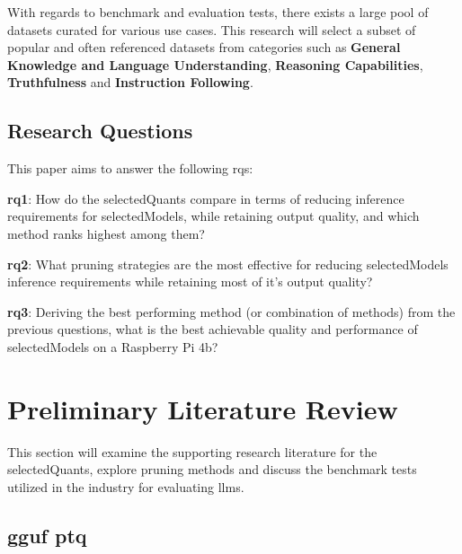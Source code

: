 \documentclass{ifacconf}
\begin{document}
	With regards to benchmark and evaluation tests, there exists a large pool of datasets curated for various use cases. This research will select a subset of popular and often referenced datasets from categories such as \textbf{General Knowledge and Language Understanding}, \textbf{Reasoning Capabilities}, \textbf{Truthfulness} and \textbf{Instruction Following}.
	
	\subsection{Research Questions}
	This paper aims to answer the following \glspl{rq}:
	
	\textbf{\gls{rq}1}: How do the \gls{selectedQuants} compare in terms of reducing inference requirements for \gls{selectedModels}, while retaining output quality, and which method ranks highest among them?
	
	\textbf{\gls{rq}2}: What pruning strategies are the most effective for reducing \gls{selectedModels} inference requirements while retaining most of it's output quality?
	
	\textbf{\gls{rq}3}: Deriving the best performing method (or combination of methods) from the previous questions, what is the best achievable quality and performance of \gls{selectedModels} on a Raspberry Pi 4b?
	
	
	\section{Preliminary Literature Review}
	This section will examine the supporting research literature for the \gls{selectedQuants}, explore pruning methods and discuss the benchmark tests utilized in the industry for evaluating \glspl{llm}.
	
	\subsection{\gls{gguf} \gls{ptq}}
	
\end{document}
